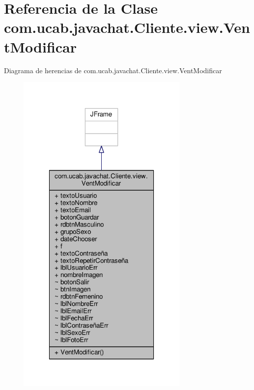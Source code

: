 \hypertarget{classcom_1_1ucab_1_1javachat_1_1_cliente_1_1view_1_1_vent_modificar}{\section{Referencia de la Clase com.\-ucab.\-javachat.\-Cliente.\-view.\-Vent\-Modificar}
\label{classcom_1_1ucab_1_1javachat_1_1_cliente_1_1view_1_1_vent_modificar}
}


Diagrama de herencias de com.\-ucab.\-javachat.\-Cliente.\-view.\-Vent\-Modificar
\nopagebreak
\begin{figure}[H]
\begin{center}
\leavevmode
\includegraphics[width=238pt]{d6/d7f/classcom_1_1ucab_1_1javachat_1_1_cliente_1_1view_1_1_vent_modificar__inherit__graph}
\end{center}
\end{figure}


